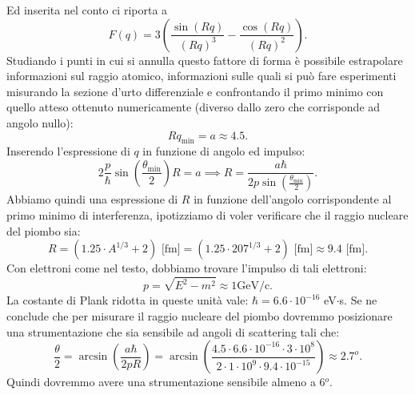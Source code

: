 Ed inserita nel conto ci riporta a 
\[
	F\left( q \right) = 3\left( \frac{\sin\left( Rq \right) }{\left( Rq \right)^3}- \frac{\cos\left( Rq \right) }{\left( Rq \right)^2} \right) 
.\] 
Studiando i punti in cui si annulla questo fattore di forma è possibile estrapolare informazioni sul raggio atomico, informazioni sulle quali si può fare esperimenti misurando la sezione d'urto differenziale e confrontando il primo minimo con quello atteso ottenuto numericamente (diverso dallo zero che corrisponde ad angolo nullo): 
\[
	Rq_{\text{min}} = a \approx 4.5
.\] 
Inserendo l'espressione di $q$ in funzione di angolo ed impulso:
\[
	2 \frac{p}{\hbar} \sin\left( \frac{\theta_{\text{min}}}{2} \right) R = a \implies R = \frac{a \hbar}{2 p \sin\left( \frac{\theta_{\text{min}}}{2} \right) } 
.\] 
Abbiamo quindi una espressione di $R$ in funzione dell'angolo corrispondente al primo minimo di interferenza, ipotizziamo di voler verificare che il raggio nucleare del piombo sia:
\[
	R = \left( 1.25\cdot A^{1 /3} + 2 \right)\text{ [fm]} = \left(1.25\cdot 207^{1 /3} + 2 \right)\text{ [fm]} \approx 9.4 \text{ [fm]}  
.\] 
Con elettroni come nel testo, dobbiamo trovare l'impulso di tali elettroni:
\[
	p = \sqrt{E^2-m^2} \approx 1 \text{GeV/c}	
.\] 
La costante di Plank ridotta in queste unità vale: $\hbar = 6.6 \cdot 10^{-16}$ eV$\cdot$s. Se ne conclude che per misurare il raggio nucleare del piombo dovremmo posizionare una strumentazione che sia sensibile ad angoli di scattering tali che:
\[
\frac{\theta}{2} = \arcsin \left(\frac{a \hbar}{2pR}\right) = \arcsin \left( \frac{4.5\cdot 6.6 \cdot 10^{-16}\cdot 3 \cdot 10^{8} }{2\cdot 1\cdot 10^{9}\cdot 9.4 \cdot 10^{-15}}\right) \approx 2.7^o
 .\]
 Quindi dovremmo avere una strumentazione sensibile almeno a 6$^o$.

